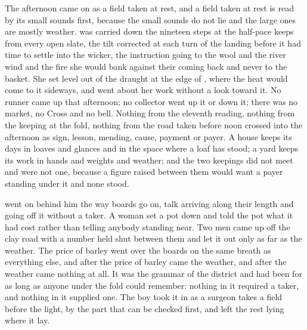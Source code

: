 The afternoon came on as a field taken at rest, and a field taken at rest is read by its small sounds first, because the small sounds do not lie and the large ones are mostly weather.  was carried down the nineteen steps at the half-pace  keeps from every open slate, the tilt corrected at each turn of the landing before it had time to settle into the wicker, the instruction going to the wool and the river wind and the fire she would bank against their coming back and never to the basket. She set  level out of the draught at the edge of , where the heat would come to it sideways, and went about her work without a look toward it. No runner came up  that afternoon; no collector went up it or down it; there was no market, no Cross and no bell. Nothing from the eleventh reading, nothing from the keeping at the fold, nothing from the road taken before noon crossed into the afternoon as sign, lesson, mending, cause, payment or payer. A house keeps its days in loaves and glances and in the space where a loaf has stood; a yard keeps its work in hands and weights and weather; and the two keepings did not meet and were not one, because a figure raised between them would want a payer standing under it and none stood.

 went on behind him the way boards go on, talk arriving along their length and going off it without a taker. A woman set a pot down and told the pot what it had cost rather than telling anybody standing near. Two men came up off the clay road with a number held shut between them and let it out only as far as the weather. The price of barley went over the boards on the same breath as everything else, and after the price of barley came the weather, and after the weather came nothing at all. It was the grammar of the district and had been for as long as anyone under the fold could remember: nothing in it required a taker, and nothing in it supplied one. The boy took it in as a surgeon takes a field before the light, by the part that can be checked first, and left the rest lying where it lay.

